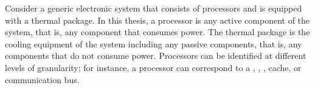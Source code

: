 Consider a generic electronic system that consists of \np processors and is
equipped with a thermal package. In this thesis, a processor is any active
component of the system, that is, any component that consumes power. The thermal
package is the cooling equipment of the system including any passive components,
that is, any components that do not consume power. Processors can be identified
at different levels of granularity; for instance, a processor can correspond to
a , , , cache, or communication bus.
